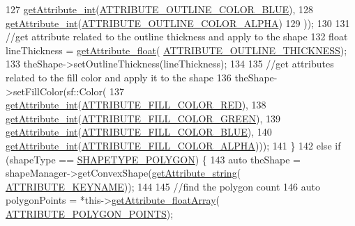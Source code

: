 \begin{DoxyCode}
127             \hyperlink{class_abstract_component_a16ac644f742683149b78d01b787eb3bd}{getAttribute\_int}(\hyperlink{_a_e___attributes_8h_a6f224f25c3045b0c0ff6eb9ebfb75b85}{ATTRIBUTE\_OUTLINE\_COLOR\_BLUE}),
128             \hyperlink{class_abstract_component_a16ac644f742683149b78d01b787eb3bd}{getAttribute\_int}(\hyperlink{_a_e___attributes_8h_a5dc3e53458601ca0d4562198560c6e42}{ATTRIBUTE\_OUTLINE\_COLOR\_ALPHA})
129             ));
130         
131         \textcolor{comment}{//get attribute related to the outline thickness and apply to the shape}
132         \textcolor{keywordtype}{float} lineThickness = \hyperlink{class_abstract_component_a890ca92530f6b39afe8c261ce27709c7}{getAttribute\_float}(
      \hyperlink{_a_e___attributes_8h_ad658dbd44975ac4e266311f3ae29ab00}{ATTRIBUTE\_OUTLINE\_THICKNESS});
133         theShape->setOutlineThickness(lineThickness);
134         
135         \textcolor{comment}{//get attributes related to the fill color and apply it to the shape}
136         theShape->setFillColor(sf::Color(
137             \hyperlink{class_abstract_component_a16ac644f742683149b78d01b787eb3bd}{getAttribute\_int}(\hyperlink{_a_e___attributes_8h_a3725edfd1b846140eb49aa34b027b2cb}{ATTRIBUTE\_FILL\_COLOR\_RED}),
138             \hyperlink{class_abstract_component_a16ac644f742683149b78d01b787eb3bd}{getAttribute\_int}(\hyperlink{_a_e___attributes_8h_a44093150b0166936e44f0748babd201c}{ATTRIBUTE\_FILL\_COLOR\_GREEN}),
139             \hyperlink{class_abstract_component_a16ac644f742683149b78d01b787eb3bd}{getAttribute\_int}(\hyperlink{_a_e___attributes_8h_a7c1ee03e64d7b6dd251b709f0130cc62}{ATTRIBUTE\_FILL\_COLOR\_BLUE}),
140             \hyperlink{class_abstract_component_a16ac644f742683149b78d01b787eb3bd}{getAttribute\_int}(\hyperlink{_a_e___attributes_8h_a66939dddc263c09ff273450168b31918}{ATTRIBUTE\_FILL\_COLOR\_ALPHA})));
141     \}
142     \textcolor{keywordflow}{else} \textcolor{keywordflow}{if} (shapeType == \hyperlink{_a_e___attributes_8h_a8cdd66786d6e0ac4a43efc26533ff4e1}{SHAPETYPE\_POLYGON}) \{
143         \textcolor{keyword}{auto} theShape = shapeManager->getConvexShape(\hyperlink{class_abstract_component_a4140957094ef40c4ffaa0ef381d00ce5}{getAttribute\_string}(
      \hyperlink{_a_e___attributes_8h_a38d48cad306c55d90faa362aa5023de8}{ATTRIBUTE\_KEYNAME}));
144 
145         \textcolor{comment}{//find the polygon count}
146         \textcolor{keyword}{auto} polygonPoints = *this->\hyperlink{class_abstract_component_a7289cf7b6f2bfdb9819f3cf337af9845}{getAttribute\_floatArray}(
      \hyperlink{_a_e___attributes_8h_a26ee781739ac518473cf414ecc968239}{ATTRIBUTE\_POLYGON\_POINTS});

\end{DoxyCode}
